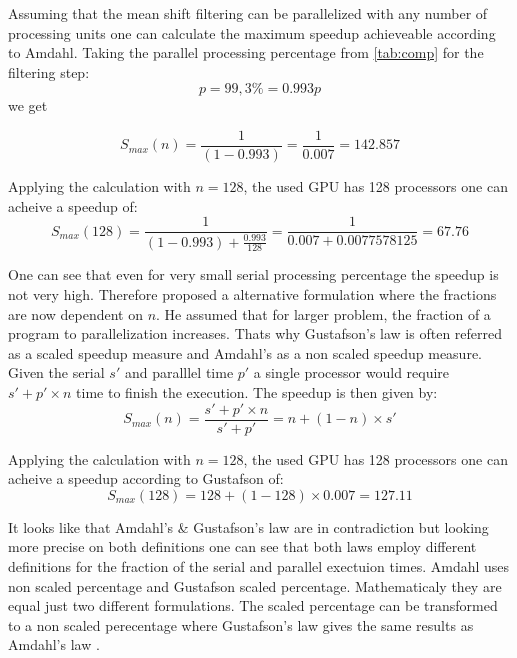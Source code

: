 Assuming that the mean shift filtering can be parallelized with any
number of processing units one can calculate the maximum speedup
achieveable according to Amdahl. Taking the parallel processing
percentage from \autoref{tab:comp} for the filtering step:
\begin{equation*}\label{eq:parallel}
  p = 99,3\% = 0.993 
  p\end{equation*}
we get

\begin{equation*}\label{eq:am0}
  S_{max}(n) = \frac{1}{(1-0.993)} = \frac{1}{0.007} = 142.857	
\end{equation*}

Applying the calculation with $n = 128$, the used \gls{GPU} has 128
processors one can acheive a speedup of:
\begin{equation*}\label{eq:g92sp}
  S_{max}(128) = \frac{1}{(1-0.993) + \frac{0.993}{128}} = \frac{1}{0.007 + 0.0077578125} = 67.76
\end{equation*}

One can see that even for very small serial processing percentage the
speedup is not very high. Therefore \citeauthor{citeulike:3732921}
proposed a alternative formulation where the fractions are now
dependent on $n$. He assumed that for larger problem, the fraction of
a program to parallelization increases. Thats why Gustafson's law is
often referred as a scaled speedup measure and Amdahl's as a non
scaled speedup measure. Given the serial $s'$ and paralllel time $p'$
a single processor would require $s' + p' \times n$ time to finish the
execution.  The speedup is then given by:
\begin{equation}\label{eq:gus}
  S_{max}(n) = \frac{s' + p' \times n}{s' + p'} = n + ( 1 - n ) \times s'
\end{equation}

Applying the calculation with $n = 128$, the used \gls{GPU} has 128
processors one can acheive a speedup according to Gustafson of:
\begin{equation*}\label{eq:g92sp}
  S_{max}(128) = 128 + (1 - 128) \times 0.007 = 127.11
\end{equation*}


It looks like that Amdahl's \& Gustafson's law are in contradiction
but looking more precise on both definitions one can see that both
laws employ different definitions for the fraction of the serial and
parallel exectuion times. Amdahl uses non scaled percentage and
Gustafson scaled percentage. Mathematicaly they are equal just two
different formulations. The scaled percentage can be transformed to a
non scaled perecentage where Gustafson's law gives the same results as
Amdahl's law \citep{citeulike:3838998}.

